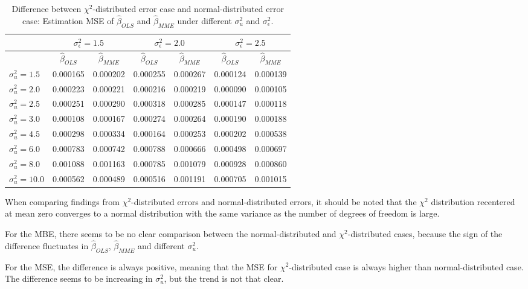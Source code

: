 \documentclass{article}
\begin{document}
\begin{table}[ht]
    \centering
    \caption{Difference between $\chi^2$-distributed error case and normal-distributed error case: Estimation MSE of $\hat{\beta}_{OLS}$ and $\hat{\beta}_{MME}$ under different $\sigma^2_u$ and $\sigma^2_\epsilon$.}
    \label{Tab:MSE_diff_chi_normal}
    \begin{tabular}[t]{lcccccc}
        \hline
        &\multicolumn{2}{c}{$\sigma^2_\epsilon=1.5$}&\multicolumn{2}{c}{$\sigma^2_\epsilon=2.0$}&\multicolumn{2}{c}{$\sigma^2_\epsilon=2.5$}\\
        \hline
        &$\hat{\beta}_{OLS}$&$\hat{\beta}_{MME}$&$\hat{\beta}_{OLS}$&$\hat{\beta}_{MME}$&$\hat{\beta}_{OLS}$&$\hat{\beta}_{MME}$\\
        \hline
        $\sigma^2_u = 1.5$&0.000165&0.000202&0.000255&0.000267&0.000124&0.000139\\
        $\sigma^2_u = 2.0$&0.000223&0.000221&0.000216&0.000219&0.000090&0.000105\\
        $\sigma^2_u = 2.5$&0.000251&0.000290&0.000318&0.000285&0.000147&0.000118\\
        $\sigma^2_u = 3.0$&0.000108&0.000167&0.000274&0.000264&0.000190&0.000188\\
        $\sigma^2_u = 4.5$&0.000298&0.000334&0.000164&0.000253&0.000202&0.000538\\
        $\sigma^2_u = 6.0$&0.000783&0.000742&0.000788&0.000666&0.000498&0.000697\\
        $\sigma^2_u = 8.0$&0.001088&0.001163&0.000785&0.001079&0.000928&0.000860\\
        $\sigma^2_u = 10.0$&0.000562&0.000489&0.000516&0.001191&0.000705&0.001015\\
    \end{tabular}
\end{table}

When comparing findings from $\chi^2$-distributed errors and normal-distributed errors, it should be noted that the $\chi^2$ distribution recentered at mean zero converges to a normal distribution with the same variance as the number of degrees of freedom is large.

For the MBE, there seems to be no clear comparison between the normal-distributed and $\chi^2$-distributed cases,
because the sign of the difference fluctuates in $\hat{\beta}_{OLS}$, $\hat{\beta}_{MME}$ and different $\sigma^2_u$.

For the MSE, the difference is always positive, meaning that the MSE for $\chi^2$-distributed case is always higher than normal-distributed case.
The difference seems to be increasing in $\sigma^2_u$, but the trend is not that clear. 
\end{document}
